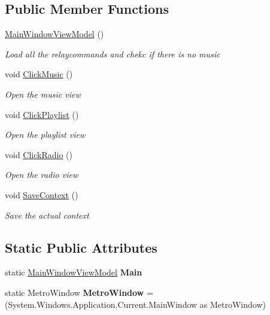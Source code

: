 \subsection*{Public Member Functions}
\begin{DoxyCompactItemize}
\item 
\hyperlink{class_presentation_1_1_view_model_1_1_main_window_view_model_a05bd3d883c2a4082b5d265f9c9b7e521}{Main\+Window\+View\+Model} ()
\begin{DoxyCompactList}\small\item\em Load all the relaycommands and chekc if there is no music \end{DoxyCompactList}\item 
void \hyperlink{class_presentation_1_1_view_model_1_1_main_window_view_model_ae0cd1aad0ab006978a0960a860a13c22}{Click\+Music} ()
\begin{DoxyCompactList}\small\item\em Open the music view \end{DoxyCompactList}\item 
void \hyperlink{class_presentation_1_1_view_model_1_1_main_window_view_model_a2758217be5d01273574939025c5ff937}{Click\+Playlist} ()
\begin{DoxyCompactList}\small\item\em Open the playlist view \end{DoxyCompactList}\item 
void \hyperlink{class_presentation_1_1_view_model_1_1_main_window_view_model_a62f6e4ed74af5d290ca6886d9dbf2a34}{Click\+Radio} ()
\begin{DoxyCompactList}\small\item\em Open the radio view \end{DoxyCompactList}\item 
void \hyperlink{class_presentation_1_1_view_model_1_1_main_window_view_model_a6dc7186d6c37dad719f22cc6e6b4efc8}{Save\+Context} ()
\begin{DoxyCompactList}\small\item\em Save the actual context \end{DoxyCompactList}\end{DoxyCompactItemize}
\subsection*{Static Public Attributes}
\begin{DoxyCompactItemize}
\item 
\mbox{\label{class_presentation_1_1_view_model_1_1_main_window_view_model_a0c47ee3af00198ade201f6b4d847f104}} 
static \hyperlink{class_presentation_1_1_view_model_1_1_main_window_view_model}{Main\+Window\+View\+Model} {\bfseries Main}
\item 
\mbox{\label{class_presentation_1_1_view_model_1_1_main_window_view_model_a8380e5ea810180a647ecdbb8048a92c6}} 
static Metro\+Window {\bfseries Metro\+Window} = (System.\+Windows.\+Application.\+Current.\+Main\+Window as Metro\+Window)
\end{DoxyCompactItemize}
